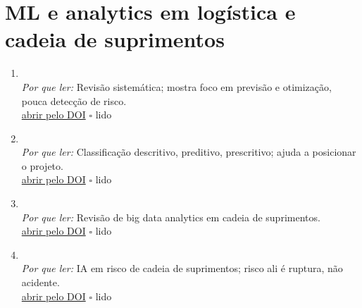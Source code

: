 \section{ML e analytics em logística e cadeia de suprimentos}
\begin{enumerate}[leftmargin=*]
  \item {}\\
  \textit{Por que ler:} Revisão sistemática; mostra foco em previsão e otimização, pouca detecção de risco.\\
  \href{https://doi.org/10.1108/BIJ-10-2020-0514}{abrir pelo DOI} \hfill $\square$ \textsf{\small lido}
  \item {}\\
  \textit{Por que ler:} Classificação descritivo, preditivo, prescritivo; ajuda a posicionar o projeto.\\
  \href{https://doi.org/10.1016/j.ijpe.2016.03.014}{abrir pelo DOI} \hfill $\square$ \textsf{\small lido}
  \item {}\\
  \textit{Por que ler:} Revisão de big data analytics em cadeia de suprimentos.\\
  \href{https://doi.org/10.1016/j.cor.2017.07.004}{abrir pelo DOI} \hfill $\square$ \textsf{\small lido}
  \item {}\\
  \textit{Por que ler:} IA em risco de cadeia de suprimentos; risco ali é ruptura, não acidente.\\
  \href{https://doi.org/10.1080/00207543.2018.1530476}{abrir pelo DOI} \hfill $\square$ \textsf{\small lido}
\end{enumerate}

